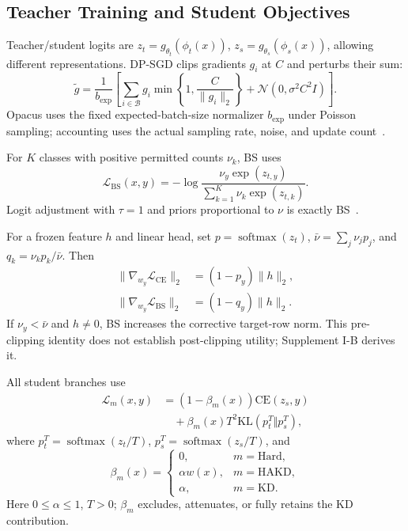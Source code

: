 \documentclass[journal]{IEEEtran}
\theoremstyle{definition}
\theoremstyle{plain}
\begin{document}
\subsection{Teacher Training and Student Objectives}
\label{sec:teacher_student_objectives}
Teacher/student logits are $z_t=g_{\theta_t}(\phi_t(x))$, $z_s=g_{\theta_s}(\phi_s(x))$, allowing different representations. DP-SGD clips gradients $g_i$ at $C$ and perturbs their sum:
\begin{equation}
\widetilde g=\frac{1}{b_{\mathrm{exp}}}\left[\sum_{i\in\mathcal B}g_i\min\!\left\{1,\frac{C}{\|g_i\|_2}\right\}+\mathcal N(0,\sigma^2C^2I)\right].
\end{equation}
Opacus uses the fixed expected-batch-size normalizer $b_{\mathrm{exp}}$ under Poisson sampling; accounting uses the actual sampling rate, noise, and update count~\cite{abadi2016deepLearningDP,mironov2017rdp}.

For $K$ classes with positive permitted counts $\nu_k$, BS uses~\cite{ren2020balanced}
\begin{equation}
\mathcal L_{\mathrm{BS}}(x,y)=-\log\frac{\nu_y\exp(z_{t,y})}{\sum_{k=1}^K\nu_k\exp(z_{t,k})}.
\label{eq:bs}
\end{equation}
Logit adjustment with $\tau=1$ and priors proportional to $\nu$ is exactly BS~\cite{menon2021longtail}.

For a frozen feature $h$ and linear head, set $p=\operatorname{softmax}(z_t)$, $\bar\nu=\sum_j\nu_jp_j$, and $q_k=\nu_kp_k/\bar\nu$. Then
\begin{equation}
\begin{aligned}
\|\nabla_{w_y}\mathcal L_{\mathrm{CE}}\|_2&=(1-p_y)\|h\|_2,\\
\|\nabla_{w_y}\mathcal L_{\mathrm{BS}}\|_2&=(1-q_y)\|h\|_2.
\end{aligned}
\end{equation}
If $\nu_y<\bar\nu$ and $h\ne0$, BS increases the corrective target-row norm. This pre-clipping identity does not establish post-clipping utility; Supplement I-B derives it.

All student branches use
\begin{equation}
\begin{aligned}
\mathcal L_m(x,y)&=(1-\beta_m(x))\mathrm{CE}(z_s,y)\\
&\quad+\beta_m(x)T^2\mathrm{KL}(p_t^T\Vert p_s^T),
\end{aligned}
\label{eq:unified_student}
\end{equation}
where $p_t^T=\operatorname{softmax}(z_t/T)$, $p_s^T=\operatorname{softmax}(z_s/T)$, and
\begin{equation}
\beta_m(x)=\begin{cases}
0,&m=\mathrm{Hard},\\
\alpha w(x),&m=\mathrm{HAKD},\\
\alpha,&m=\mathrm{KD}.
\end{cases}
\label{eq:action_weights}
\end{equation}
Here $0\le\alpha\le1$, $T>0$; $\beta_m$ excludes, attenuates, or fully retains the KD contribution.
\end{document}
